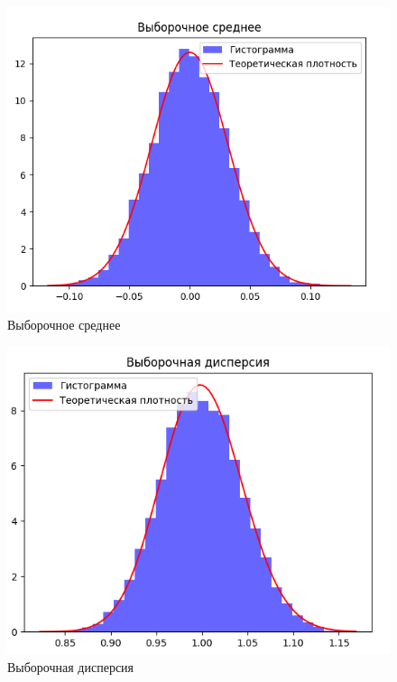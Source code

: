 \documentclass[14pt]{extreport}
\begin{document}
\begin{figure}[H]
    \centering
    \includegraphics[width=0.9\linewidth]{1.png}
    \caption{Выборочное среднее}
\end{figure}

\begin{figure}[H]
    \centering
    \includegraphics[width=0.9\linewidth]{2.png}
    \caption{Выборочная дисперсия}
\end{figure}
\end{document}
